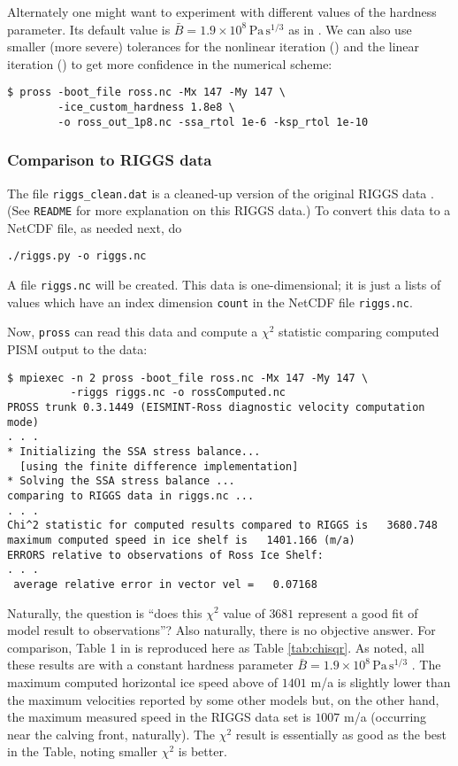 Alternately one might want to experiment with different values of the hardness parameter.  Its default value is $\bar B = 1.9 \times 10^8 \, \text{Pa}\, \text{s}^{1/3}$ as in \cite{MacAyealetal}.   We can also use smaller (more severe) tolerances for the nonlinear iteration () and the linear iteration () to get more confidence in the numerical scheme:

\begin{verbatim}
$ pross -boot_file ross.nc -Mx 147 -My 147 \
        -ice_custom_hardness 1.8e8 \
        -o ross_out_1p8.nc -ssa_rtol 1e-6 -ksp_rtol 1e-10
\end{verbatim}


\subsubsection*{Comparison to RIGGS data}  The file \texttt{riggs_clean.dat} is a cleaned-up version of the original RIGGS data \cite{RIGGS1, RIGGS2}.  (See \texttt{README} for more explanation on this RIGGS data.)  To convert this data to a NetCDF file, as needed next, do

\begin{verbatim}
./riggs.py -o riggs.nc
\end{verbatim}
A file \texttt{riggs.nc} will be created.  This data is one-dimensional; it is just a lists of values which have an index dimension \texttt{count} in the NetCDF file \texttt{riggs.nc}.

Now, \texttt{pross} can read this data and compute a $\chi^2$ statistic comparing computed PISM output to the data:

\small
\begin{verbatim}
$ mpiexec -n 2 pross -boot_file ross.nc -Mx 147 -My 147 \
          -riggs riggs.nc -o rossComputed.nc
PROSS trunk 0.3.1449 (EISMINT-Ross diagnostic velocity computation mode)
. . .
* Initializing the SSA stress balance...
  [using the finite difference implementation]
* Solving the SSA stress balance ...
comparing to RIGGS data in riggs.nc ...
. . .
Chi^2 statistic for computed results compared to RIGGS is   3680.748
maximum computed speed in ice shelf is   1401.166 (m/a)
ERRORS relative to observations of Ross Ice Shelf:
. . .
 average relative error in vector vel =   0.07168
\end{verbatim}
\normalsize

Naturally, the question is ``does this $\chi^2$ value of $3681$ represent a good fit of model result to observations''?  Also naturally, there is no objective answer.  For comparison, Table 1 in \cite{MacAyealetal} is reproduced here as Table \ref{tab:chisqr}.  As noted, all these results are with a constant hardness parameter $\bar B = 1.9 \times 10^8 \, \text{Pa}\, \text{s}^{1/3}$ \cite{MacAyealetal}. The maximum computed horizontal ice speed above of $1401$ m/a is slightly lower than the maximum velocities reported by some other models but, on the other hand, the maximum measured speed in the RIGGS data set is $1007$ m/a (occurring near the calving front, naturally).  The $\chi^2$ result is essentially as good as the best in the Table, noting smaller $\chi^2$ is better.

